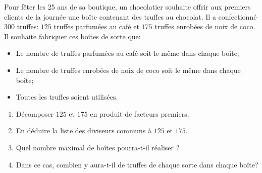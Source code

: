 \documentclass[exercice]{thedocument}%
\begin{document}
%
    Pour fêter les 25 ans de sa boutique, un chocolatier souhaite offrir aux premiers clients de la journée une boîte contenant des truffes au chocolat.
    \medskip
    Il a confectionné $300$ truffes: $125$ truffes parfumées au café et $175$ truffes enrobées de noix de coco. Il souhaite fabriquer ces boîtes de sorte que:
    \medskip
    \begin{itemize}
        \item Le nombre de truffes parfumées au café soit le même dans chaque boîte;
        \item Le nombre de truffes enrobées de noix de coco soit le même dans chaque boîte;
        \item Toutes les truffes soient utilisées.
    \end{itemize}

    \endgroup
    \begin{enumerate}
        \item Décomposer $125$ et $175$ en produit de facteurs premiers.
        \item En déduire la liste des diviseurs communs à $125$ et $175$.
        \item Quel nombre maximal de boîtes pourra-t-il réaliser ?
        \item Dans ce cas, combien y aura-t-il de truffes de chaque sorte dans chaque boîte?
    \end{enumerate}
\end{document}
